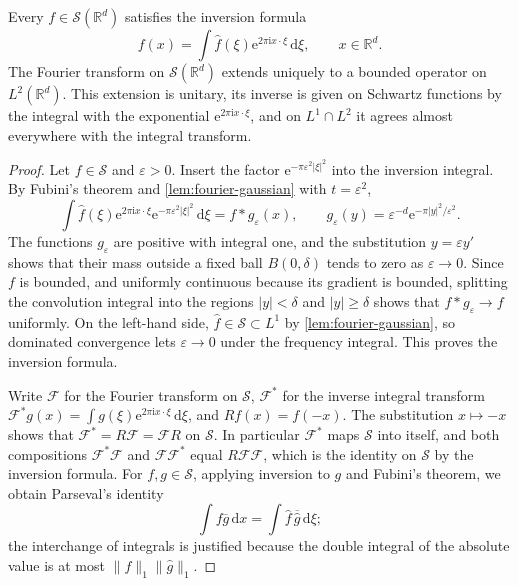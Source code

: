 \begin{theorem}[Plancherel]\label{thm:plancherel}
Every $f\in\mathcal S(\mathbb R^d)$ satisfies the inversion formula
\[
 f(x)=\int\widehat f(\xi)\mathrm e^{2\pi\mathrm i x\cdot\xi}\,\mathrm d\xi,\qquad x\in\mathbb R^d.
\]
The Fourier transform on $\mathcal S(\mathbb R^d)$ extends uniquely to a bounded operator on $L^2(\mathbb R^d)$. This extension is unitary, its inverse is given on Schwartz functions by the integral with the exponential $\mathrm e^{2\pi\mathrm i x\cdot\xi}$, and on $L^1\cap L^2$ it agrees almost everywhere with the integral transform.
\end{theorem}
\begin{proof}
Let $f\in\mathcal S$ and $\varepsilon>0$. Insert the factor $\mathrm e^{-\pi\varepsilon^2|\xi|^2}$ into the inversion integral. By Fubini's theorem and \cref{lem:fourier-gaussian} with $t=\varepsilon^2$,
\[
 \int\widehat f(\xi)\mathrm e^{2\pi\mathrm i x\cdot\xi}\mathrm e^{-\pi\varepsilon^2|\xi|^2}\,\mathrm d\xi=f*g_\varepsilon(x),
 \qquad g_\varepsilon(y)=\varepsilon^{-d}\mathrm e^{-\pi|y|^2/\varepsilon^2}.
\]
The functions $g_\varepsilon$ are positive with integral one, and the substitution $y=\varepsilon y'$ shows that their mass outside a fixed ball $B(0,\delta)$ tends to zero as $\varepsilon\to0$. Since $f$ is bounded, and uniformly continuous because its gradient is bounded, splitting the convolution integral into the regions $|y|<\delta$ and $|y|\geq\delta$ shows that $f*g_\varepsilon\to f$ uniformly. On the left-hand side, $\widehat f\in\mathcal S\subset L^1$ by \cref{lem:fourier-gaussian}, so dominated convergence lets $\varepsilon\to0$ under the frequency integral. This proves the inversion formula.

Write $\mathcal F$ for the Fourier transform on $\mathcal S$, $\mathcal F^*$ for the inverse integral transform $\mathcal F^*g(x)=\int g(\xi)\mathrm e^{2\pi\mathrm i x\cdot\xi}\,\mathrm d\xi$, and $Rf(x)=f(-x)$. The substitution $x\mapsto-x$ shows that $\mathcal F^*=R\mathcal F=\mathcal FR$ on $\mathcal S$. In particular $\mathcal F^*$ maps $\mathcal S$ into itself, and both compositions $\mathcal F^*\mathcal F$ and $\mathcal F\mathcal F^*$ equal $R\mathcal F\mathcal F$, which is the identity on $\mathcal S$ by the inversion formula. For $f,g\in\mathcal S$, applying inversion to $g$ and Fubini's theorem, we obtain Parseval's identity
\[
 \int f\overline g\,\mathrm d x=\int\widehat f\,\overline{\widehat g}\,\mathrm d\xi;
\]
the interchange of integrals is justified because the double integral of the absolute value is at most $\|f\|_1\|\widehat g\|_1$.


\end{proof}
